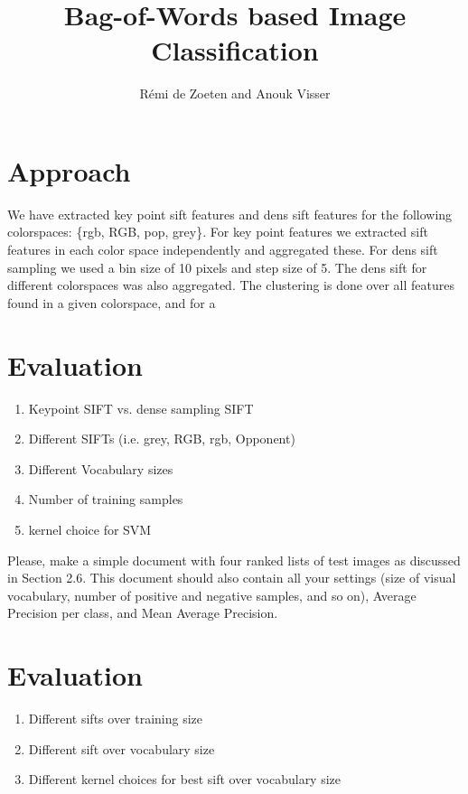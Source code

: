 \documentclass[11pt]{article}
\title{Bag-of-Words based Image Classification}
\author{R\'emi de Zoeten and Anouk Visser}
\begin{document}
\maketitle
\section{Approach}
We have extracted key point sift features and dens sift features for the following colorspaces: \{rgb, RGB, pop, grey\}. For key point features we extracted sift features in each color space independently and aggregated these. For dens sift sampling we used a bin size of 10 pixels and step size of 5. The dens sift for different colorspaces was also aggregated. The clustering is done over all features found in a given colorspace, and for a 

\section{Evaluation}
\begin{enumerate}
\item Keypoint SIFT vs. dense sampling SIFT
\item Different SIFTs (i.e. grey, RGB, rgb, Opponent)
\item Different Vocabulary sizes
\item Number of training samples
\item kernel choice for SVM
\end{enumerate}

Please, make a simple document with four ranked lists of test images as discussed in Section 2.6. This document should also contain all your settings (size of visual vocabulary, number of positive and negative samples, and so on), Average Precision per class, and Mean Average Precision.

\section{Evaluation}
\begin{enumerate}
\item Different sifts over training size
\item Different sift over vocabulary size
\item Different kernel choices for best sift over vocabulary size
\end{enumerate}
\end{document}
